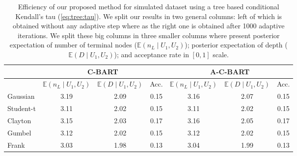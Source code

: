 \documentclass{amsart}
\begin{document}
\begin{table}[ht]
	\centering
	\begin{tabular}{l|ccc|ccc}
		\multicolumn{1}{c|}{} &
		\multicolumn{3}{c|}{C-BART} &
		\multicolumn{3}{c}{A-C-BART} \\
		\midrule
		& $\mathbb{E}(n_L\mid U_1,U_2)$ & $\mathbb{E}(D\mid U_1,U_2)$ & Acc. & $\mathbb{E}(n_L\mid U_1,U_2)$ & $\mathbb{E}(D\mid U_1,U_2)$ & Acc. \\ 
		\midrule
		Gaussian & 3.19 & 2.09 & 0.15 & 3.16 & 2.07 & 0.15 \\ 
		Student-t & 3.11 & 2.02 & 0.15 & 3.11 & 2.02 & 0.15 \\ 
		Clayton & 3.15 & 2.03 & 0.17 & 3.16 & 2.05 & 0.17 \\ 
		Gumbel & 3.12 & 2.02 & 0.15 & 3.12 & 2.02 & 0.15 \\ 
		Frank & 3.03 & 1.98 & 0.13 & 3.04 & 1.99 & 0.13 \\ 
	\end{tabular}
	\caption{Efficiency of our proposed method for simulated dataset using a tree based conditional Kendall's tau (\cref{eq:tree:tau}). We split our results in two general columns: left of which is obtained without any adaptive step where as the right one is obtained after 1000 adaptive iterations. We split these big columns in three smaller columns where present posterior expectation of number of terminal nodes ($\mathbb{E}(n_L\mid U_1,U_2)$); posterior expectation of depth ($\mathbb{E}(D\mid U_1,U_2)$); and acceptance rate in $[0,1]$ scale.}
	\label{tab:eff:ex1}
\end{table}
\end{document}
